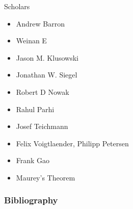 \documentclass[aspectratio=32]{beamer}
\begin{document}
\begin{frame}{Scholars}
    \begin{itemize}
        \item Andrew Barron
        \item Weinan E
        \item Jason M. Klusowski
        \item Jonathan W. Siegel
        \item Robert D Nowak
        \item Rahul Parhi
        \item Josef Teichmann
        \item Felix Voigtlaender, Philipp Petersen
        \item Frank Gao
        \item Maurey’s Theorem
    \end{itemize}
\end{frame}


\begin{frame}[t,allowframebreaks]
    \frametitle{Bibliography}
    
\end{frame}
\end{document}
